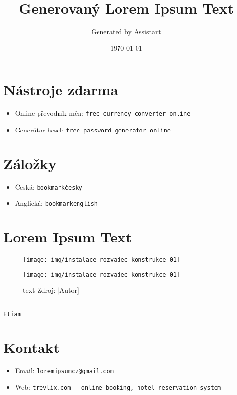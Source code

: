 \documentclass[a4paper, 12pt]{article}
\title{Generovaný Lorem Ipsum Text}
\author{Generated by Assistant}
\date{\today}
\newcommand*{\captionAuthorSource}[1]{%
    \caption[{#1}]{%
        #1%
        { Zdroj: [Autor]}%
    }%
}
\begin{document}
\maketitle

\section*{Nástroje zdarma}
\begin{itemize}
    \item Online převodník měn: \texttt{free currency converter online}
    \item Generátor hesel: \texttt{free password generator online}
\end{itemize}

\section*{Záložky}
\begin{itemize}
    \item Česká: \texttt{bookmarkčesky}
    \item Anglická: \texttt{bookmarkenglish}
\end{itemize}

\section*{Lorem Ipsum Text}




\begin{figure}[H]
    \centering
    \begin{minipage}{0.45\textwidth}
        \centering
        \texttt{[image: img/instalace\_rozvadec\_konstrukce\_01]}
        \captionAuthorSource{First example image.}
    \end{minipage}\hfill
    \begin{minipage}{0.45\textwidth}
        \centering
        \texttt{[image: img/instalace\_rozvadec\_konstrukce\_01]}
        \captionAuthorSource{text}
    \end{minipage}

\end{figure}




\begin{verbatim}

Etiam

\end{verbatim}

\section*{Kontakt}
\begin{itemize}
    \item Email: \texttt{loremipsumcz@gmail.com}
    \item Web: \texttt{trevlix.com - online booking, hotel reservation system}
\end{itemize}
\end{document}
